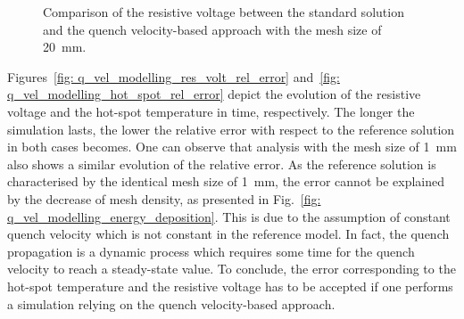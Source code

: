 \begin{figure}[H]
\centering
    \caption{Comparison of the resistive voltage between the standard solution and the quench velocity-based approach with the mesh size of 20~mm.}
    \label{fig: q_vel_modelling_res_volt_benchmarking}
\end{figure}

Figures~\ref{fig: q_vel_modelling_res_volt_rel_error} and~\ref{fig: q_vel_modelling_hot_spot_rel_error} depict the evolution of the resistive voltage and the hot-spot temperature in time, respectively.
The longer the simulation lasts, the lower the relative error with respect to the reference solution in both cases becomes. One can observe that analysis with the mesh size of 1~mm also shows a similar evolution of the relative error. As the reference solution is characterised by the identical mesh size of 1~mm, the error cannot be explained by the decrease of mesh density, as presented in Fig.~\ref{fig: q_vel_modelling_energy_deposition}. This is due to the assumption of constant quench velocity which is not constant in the reference model. In fact, the quench propagation is a dynamic process which requires some time for the quench velocity to reach a steady-state value. To conclude, the error corresponding to the hot-spot temperature and the resistive voltage has to be accepted if one performs a simulation relying on the quench velocity-based approach.

